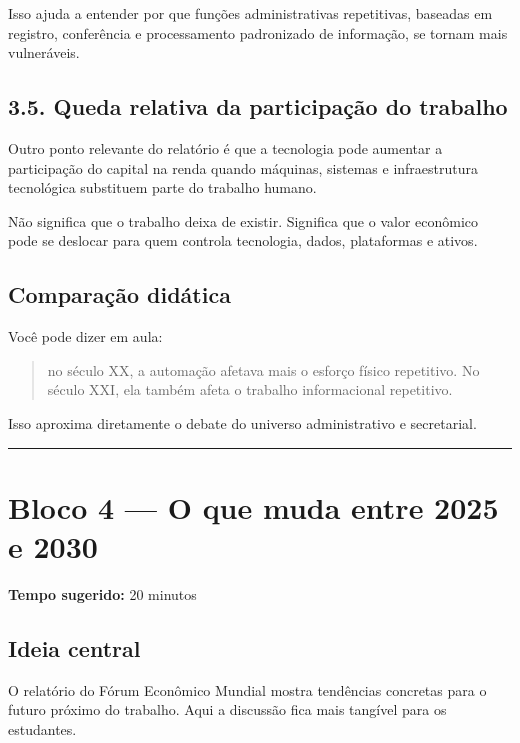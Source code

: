 \documentclass[
]{book}
\theoremstyle{definition}
\theoremstyle{definition}
\theoremstyle{definition}
\theoremstyle{definition}
\theoremstyle{remark}
\begin{document}
Isso ajuda a entender por que funções administrativas repetitivas, baseadas em registro, conferência e processamento padronizado de informação, se tornam mais vulneráveis.

\subsection{3.5. Queda relativa da participação do trabalho}\label{queda-relativa-da-participauxe7uxe3o-do-trabalho}

Outro ponto relevante do relatório é que a tecnologia pode aumentar a participação do capital na renda quando máquinas, sistemas e infraestrutura tecnológica substituem parte do trabalho humano.

Não significa que o trabalho deixa de existir.
Significa que o valor econômico pode se deslocar para quem controla tecnologia, dados, plataformas e ativos.

\subsection{Comparação didática}\label{comparauxe7uxe3o-diduxe1tica}

Você pode dizer em aula:

\begin{quote}
no século XX, a automação afetava mais o esforço físico repetitivo. No século XXI, ela também afeta o trabalho informacional repetitivo.
\end{quote}

Isso aproxima diretamente o debate do universo administrativo e secretarial.

\begin{center}\rule{0.5\linewidth}{0.5pt}\end{center}

\section{Bloco 4 --- O que muda entre 2025 e 2030}\label{bloco-4-o-que-muda-entre-2025-e-2030}

\textbf{Tempo sugerido:} 20 minutos

\subsection{Ideia central}\label{ideia-central-2}

O relatório do Fórum Econômico Mundial mostra tendências concretas para o futuro próximo do trabalho. Aqui a discussão fica mais tangível para os estudantes.
\end{document}
